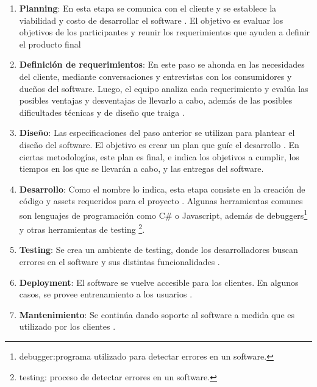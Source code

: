 \begin{enumerate}
    \item \textbf{Planning}: En esta etapa se comunica con el cliente y se establece la viabilidad y costo de desarrollar el software \cite{sStudySoftwareDevelopment2017,dwivediComparativeStudyVarious2022} . El objetivo es evaluar los objetivos de los participantes y reunir los requerimientos que ayuden a definir el producto final \cite{pressmanIngenieriaSoftwareEnfoque2013}
    \item \textbf{Definición de requerimientos}: En este paso se ahonda en las necesidades del cliente, mediante conversaciones y entrevistas con los consumidores y dueños del software. Luego, el equipo analiza cada requerimiento y evalúa las posibles ventajas y desventajas de llevarlo a cabo, además de las posibles dificultades técnicas y de diseño que traiga \cite{pressmanIngenieriaSoftwareEnfoque2013,sStudySoftwareDevelopment2017,dwivediComparativeStudyVarious2022}.
    \item \textbf{Diseño}: Las especificaciones del paso anterior se utilizan para plantear el diseño del software. El objetivo es crear un plan que guíe el desarrollo \cite{pressmanIngenieriaSoftwareEnfoque2013,sStudySoftwareDevelopment2017,dwivediComparativeStudyVarious2022}. En ciertas metodologías, este plan es final, e indica los objetivos a cumplir, los tiempos en los que se llevarán a cabo, y las entregas del software.
    \item \textbf{Desarrollo}: Como el nombre lo indica, esta etapa consiste en la creación de código y assets requeridos para el proyecto \cite{pressmanIngenieriaSoftwareEnfoque2013,sStudySoftwareDevelopment2017,dwivediComparativeStudyVarious2022}. Algunas herramientas comunes son lenguajes de programación como C\# o Javascript, además de debuggers\footnote{debugger:programa utilizado para detectar errores en un software.} y otras herramientas de testing \footnote{testing: proceso de detectar errores en un software.}.
    \item \textbf{Testing}: Se crea un ambiente de testing, donde los desarrolladores buscan errores en el software y sus distintas funcionalidades \cite{pressmanIngenieriaSoftwareEnfoque2013,sStudySoftwareDevelopment2017,dwivediComparativeStudyVarious2022}.
    \item \textbf{Deployment}: El software se vuelve accesible para los clientes. En algunos casos, se provee entrenamiento a los usuarios \cite{pressmanIngenieriaSoftwareEnfoque2013,sStudySoftwareDevelopment2017,dwivediComparativeStudyVarious2022}.
    \item \textbf{Mantenimiento}: Se continúa dando soporte al software a medida que es utilizado por los clientes \cite{pressmanIngenieriaSoftwareEnfoque2013,sStudySoftwareDevelopment2017,dwivediComparativeStudyVarious2022}.
\end{enumerate}
